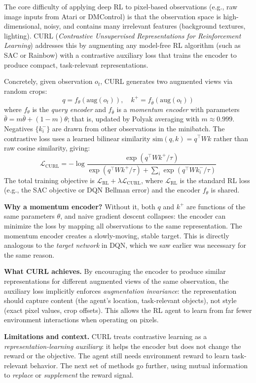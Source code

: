 \documentclass[11pt, letterpaper]{article}
\begin{document}
\begin{concept}
    The core difficulty of applying deep RL to pixel-based observations (e.g., raw image inputs from Atari or DMControl) is that the observation space is high-dimensional, noisy, and contains many irrelevant features (background textures, lighting). CURL (\textit{Contrastive Unsupervised Representations for Reinforcement Learning}) addresses this by augmenting any model-free RL algorithm (such as SAC or Rainbow) with a contrastive auxiliary loss that trains the encoder to produce compact, task-relevant representations.
 
    Concretely, given observation \(o_t\), CURL generates two augmented views via random crops:
    \[
        q = f_\theta(\text{aug}(o_t)), \quad k^+ = f_{\bar\theta}(\text{aug}(o_t))
    \]
    where \(f_\theta\) is the \textit{query encoder} and \(f_{\bar\theta}\) is a \textit{momentum encoder} with parameters \(\bar\theta = m \bar\theta + (1 - m)\theta\); that is, updated by Polyak averaging with \(m \approx 0.999\). Negatives \(\{k^-_i\}\) are drawn from other observations in the minibatch. The contrastive loss uses a learned bilinear similarity \(\text{sim}(q, k) = q^\top W k\) rather than raw cosine similarity, giving:
    \[
        \mathcal{L}_{\text{CURL}} = -\log \frac{\exp(q^\top W k^+ / \tau)}{\exp(q^\top W k^+ / \tau) + \sum_{i} \exp(q^\top W k^-_i / \tau)}
    \]
    The total training objective is \(\mathcal{L}_{\text{RL}} + \lambda \mathcal{L}_{\text{CURL}}\), where \(\mathcal{L}_{\text{RL}}\) is the standard RL loss (e.g., the SAC objective or DQN Bellman error) and the encoder \(f_\theta\) is shared.
\end{concept}
 
\begin{remark}
    \textbf{Why a momentum encoder?} Without it, both \(q\) and \(k^+\) are functions of the same parameters \(\theta\), and naive gradient descent collapses: the encoder can minimize the loss by mapping all observations to the same representation. The momentum encoder creates a slowly-moving, stable target. This is directly analogous to the \textit{target network} in DQN, which we saw earlier was necessary for the same reason.
 
    \textbf{What CURL achieves.} By encouraging the encoder to produce similar representations for different augmented views of the same observation, the auxiliary loss implicitly enforces \textit{augmentation invariance}: the representation should capture content (the agent's location, task-relevant objects), not style (exact pixel values, crop offsets). This allows the RL agent to learn from far fewer environment interactions when operating on pixels.
 
    \textbf{Limitations and context.} CURL treats contrastive learning as a \textit{representation-learning auxiliary}: it helps the encoder but does not change the reward or the objective. The agent still needs environment reward to learn task-relevant behavior. The next set of methods go further, using mutual information to \textit{replace} or \textit{supplement} the reward signal.
\end{remark}
 
\end{document}
